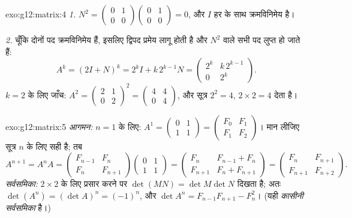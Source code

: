 \begin{solution}{exo:g12:matrix:4}
\emph{1.} $N^2 = \begin{pmatrix} 0&1\\0&0\end{pmatrix}
\begin{pmatrix} 0&1\\0&0\end{pmatrix} = 0$, और $I$ हर  के साथ क्रमविनिमेय है।

\emph{2.} चूँकि दोनों पद क्रमविनिमेय हैं, इसलिए द्विपद प्रमेय लागू होती है और
$N^2$ वाले सभी पद लुप्त हो जाते हैं:
\[
A^k = (2I + N)^k = 2^k I + k\,2^{k-1} N
= \begin{pmatrix} 2^k & k\,2^{k-1}\\ 0 & 2^k \end{pmatrix}.
\]
$k = 2$ के लिए जाँच: $A^2 = \begin{pmatrix} 2&1\\0&2\end{pmatrix}^2
= \begin{pmatrix} 4&4\\0&4\end{pmatrix}$, और सूत्र $2^2 = 4$, $2 \times 2 = 4$ देता है। \checkmark
\end{solution}

\begin{solution}{exo:g12:matrix:5}
\emph{आगमन:} $n = 1$ के लिए: $A^1 = \begin{pmatrix} 0&1\\1&1\end{pmatrix}
= \begin{pmatrix} F_0 & F_1\\ F_1 & F_2\end{pmatrix}$। मान लीजिए सूत्र $n$ के लिए सही है; तब
\[
A^{n+1} = A^n A
= \begin{pmatrix} F_{n-1} & F_n\\ F_n & F_{n+1}\end{pmatrix}
\begin{pmatrix} 0 & 1\\ 1 & 1\end{pmatrix}
= \begin{pmatrix} F_n & F_{n-1} + F_n\\ F_{n+1} & F_n + F_{n+1}\end{pmatrix}
= \begin{pmatrix} F_n & F_{n+1}\\ F_{n+1} & F_{n+2}\end{pmatrix}.
\]
\emph{सर्वसमिका:} $2\times2$  के लिए प्रसार करने पर $\det(MN) = \det M \det N$ दिखता है; अतः $\det(A^n) = (\det A)^n = (-1)^n$,
और $\det A^n = F_{n-1}F_{n+1} - F_n^2$। (यही \emph{कासीनी सर्वसमिका} है।)
\end{solution}

